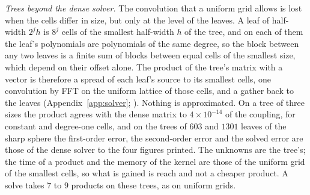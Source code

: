\documentclass[11pt,a4paper]{article}
\begin{document}
\emph{Trees beyond the dense solver.} The convolution that a uniform grid allows is lost when the
cells differ in size, but only at the level of the leaves. A leaf of half-width $2^jh$ is $8^j$ cells
of the smallest half-width $h$ of the tree, and on each of them the leaf's polynomials are polynomials
of the same degree, so the block between any two leaves is a finite sum of blocks between equal cells of
the smallest size, which depend on their offset alone. The product of the tree's matrix with a vector is
therefore a spread of each leaf's source to its smallest cells, one convolution by FFT on the uniform
lattice of those cells, and a gather back to the leaves (Appendix~\ref{app:solver};
). Nothing is approximated. On a tree of three sizes
the product agrees with the dense matrix to $4\times10^{-14}$ of the coupling, for constant and
degree-one cells, and on the trees of $603$ and $1301$ leaves of the sharp sphere the first-order error, the
second-order error and the solved error are those of the dense solver to the four figures printed. The
unknowns are the tree's; the time of a product and the memory of the kernel are those of the uniform
grid of the smallest cells, so what is gained is reach and not a cheaper product. A solve takes $7$ to
$9$ products on these trees, as on uniform grids.
\end{document}
